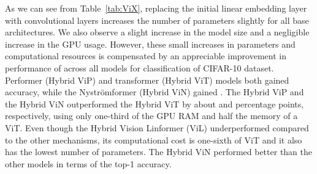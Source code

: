 \documentclass{article}
\begin{document}
\begin{table*}[h]
\centering
{}
\caption{Test accuracy and various requirements of models compared on the Tiny ImageNet dataset for a batch size of 64}
\label{tab:tiny}
\end{table*}
As we can see from Table~\ref{tab:ViX}, replacing the initial linear embedding layer with convolutional layers increases the number of parameters slightly for all base architectures. We also observe a slight increase in the model size and a negligible increase in the GPU usage. However, these small increases in parameters and computational resources is compensated by an appreciable improvement in performance of  across all models for classification of CIFAR-10 dataset. Performer (Hybrid ViP) and transformer (Hybrid ViT) models both gained  accuracy, while the Nyströmformer (Hybrid ViN) gained . The Hybrid ViP and the Hybrid ViN outperformed the Hybrid ViT by about  and  percentage points, respectively, using only one-third of the GPU RAM and half the memory of a ViT. Even though the Hybrid Vision Linformer (ViL) underperformed compared to the other mechanisms, its computational cost is one-sixth of ViT and it also has the lowest number of parameters. The Hybrid ViN performed better than the other models in terms of the top-1 accuracy. 
\end{document}
